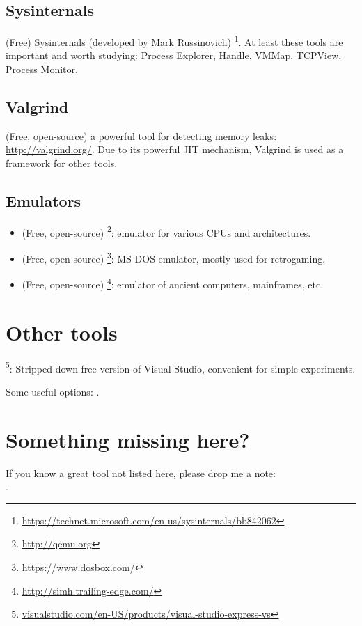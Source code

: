 \subsection{Sysinternals}

(Free) Sysinternals (developed by Mark Russinovich)
\footnote{\url{https://technet.microsoft.com/en-us/sysinternals/bb842062}}.
At least these tools are important and worth studying: Process Explorer, Handle, VMMap, TCPView, Process Monitor.

\subsection{Valgrind}

(Free, open-source) a powerful tool for detecting memory leaks: \url{http://valgrind.org/}.
Due to its powerful \ac{JIT} mechanism, Valgrind is used as a framework for other tools.


\subsection{Emulators}

\begin{itemize}
\item (Free, open-source) \footnote{\url{http://qemu.org}}: emulator for various CPUs and architectures.

\item (Free, open-source) \footnote{\url{https://www.dosbox.com/}}: MS-DOS emulator, mostly used for retrogaming.

\item (Free, open-source) \footnote{\url{http://simh.trailing-edge.com/}}: emulator of ancient computers, mainframes, etc.
\end{itemize}

\section{Other tools}

\footnote{\href{http://go.yurichev.com/17034}{visualstudio.com/en-US/products/visual-studio-express-vs}}:
Stripped-down free version of Visual Studio, convenient for simple experiments.

Some useful options: .

\section{Something missing here?}

If you know a great tool not listed here, please drop me a note:\\
\TT{\EMAIL}.


